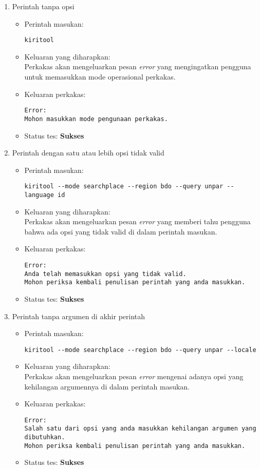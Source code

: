 \begin{enumerate}
	\item Perintah tanpa opsi
	\begin{itemize}
		\item Perintah masukan:
		\begin{lstlisting}
kiritool
		\end{lstlisting}
		\item Keluaran yang diharapkan: \\
		Perkakas akan mengeluarkan pesan \textit{error} yang mengingatkan pengguna untuk memasukkan mode operasional perkakas.
		\item Keluaran perkakas:
		\begin{lstlisting}
Error:
Mohon masukkan mode pengunaan perkakas.
		\end{lstlisting}
		\item Status tes: \textbf{Sukses}
	\end{itemize}
	
	\item Perintah dengan satu atau lebih opsi tidak valid
	\begin{itemize}
		\item Perintah masukan:
		\begin{lstlisting}
kiritool --mode searchplace --region bdo --query unpar --language id
		\end{lstlisting}
		\item Keluaran yang diharapkan: \\
		Perkakas akan mengeluarkan pesan \textit{error} yang memberi tahu pengguna bahwa ada opsi yang tidak valid di dalam perintah masukan.
		\item Keluaran perkakas:
		\begin{lstlisting}
Error:
Anda telah memasukkan opsi yang tidak valid.
Mohon periksa kembali penulisan perintah yang anda masukkan.
		\end{lstlisting}
		\item Status tes: \textbf{Sukses}
	\end{itemize}
	
	\item Perintah tanpa argumen di akhir perintah
	\begin{itemize}
		\item Perintah masukan:
		\begin{lstlisting}
kiritool --mode searchplace --region bdo --query unpar --locale
		\end{lstlisting}
		\item Keluaran yang diharapkan: \\
		Perkakas akan mengeluarkan pesan \textit{error} mengenai adanya opsi yang kehilangan argumennya di dalam perintah masukan.
		\item Keluaran perkakas:
		\begin{lstlisting}
Error:
Salah satu dari opsi yang anda masukkan kehilangan argumen yang dibutuhkan.
Mohon periksa kembali penulisan perintah yang anda masukkan.
		\end{lstlisting}
		\item Status tes: \textbf{Sukses}
	\end{itemize}
	

\end{enumerate}
